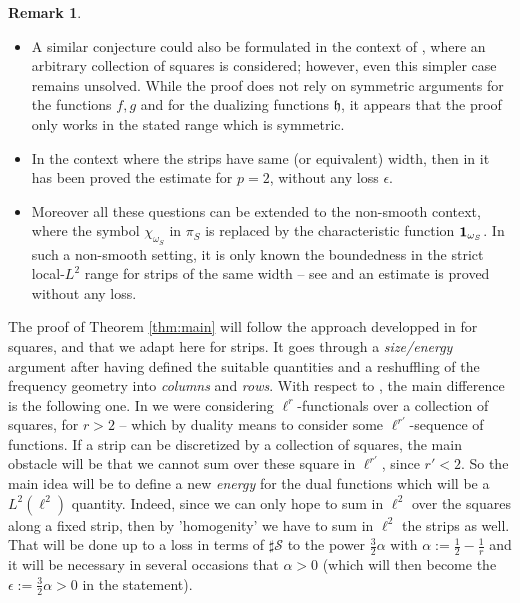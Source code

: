 \documentclass[a4paper,11pt,oneside]{amsart}
\newcommand{\hh}{\mathfrak{h}}
\theoremstyle{plain}
\theoremstyle{definition}
\newtheorem{remark}[theorem]{Remark}
\begin{document}
\begin{remark}
\begin{itemize}
\item[(a)] A similar conjecture could also be formulated in the context of \cite{BB}, where an arbitrary collection of squares is considered; however, even this simpler case remains unsolved. While the proof does not rely on symmetric arguments for the functions $f,g$ and for the dualizing functions $\hh$, it appears that the proof only works in the stated range which is symmetric. 

\item[(b)] In the context where the strips have same (or equivalent) width, then in \cite{GPS} it has been proved the estimate for $p=2$, without any loss $\epsilon$.

\item[(c)] Moreover all these questions can be extended to the non-smooth context, where the symbol $\chi_{\omega_S}$ in $ \pi_S$ is replaced by the characteristic function ${\bf 1}_{\omega_S}$. In such a non-smooth setting, it is only known the boundedness in the strict local-$L^2$ range for strips of the same width -- see \cite{B} and an estimate is proved without any loss.
\end{itemize}
\end{remark}

\bigskip

The proof of Theorem \ref{thm:main} will follow the approach developped in \cite{BB} for squares, and that we adapt here for strips. It goes through a {\it size/energy} argument after having defined the suitable quantities and a reshuffling of the frequency geometry into {\it columns} and {\it rows}. With respect to \cite{BB}, the main difference is the following one. In \cite{BB} we were considering $\ell^{r}$-functionals over a collection of squares, for $r>2$ -- which by duality means to consider some $\ell^{r'}$-sequence of functions. If a strip can be discretized by a collection of squares, the main obstacle will be that we cannot sum over these square in $\ell^{r'}$, since $r'<2$. So the main idea will be to define a new {\it energy} for the dual functions which will be a $L^2(\ell^2)$ quantity. Indeed, since we can only hope to sum in $\ell^2$ over the squares along a fixed strip, then by 'homogenity' we have to sum in $\ell^2$ the strips as well. That will be done up to a loss in terms of $\sharp {\mathcal S}$ to the power $\frac{3}{2} \alpha$ with $\alpha:=\frac{1}{2}-\frac{1}{r}$ and it will be necessary in several occasions that $\alpha>0$ (which will then become the $\epsilon:=\frac{3}{2}\alpha>0$ in the statement).
\end{document}
